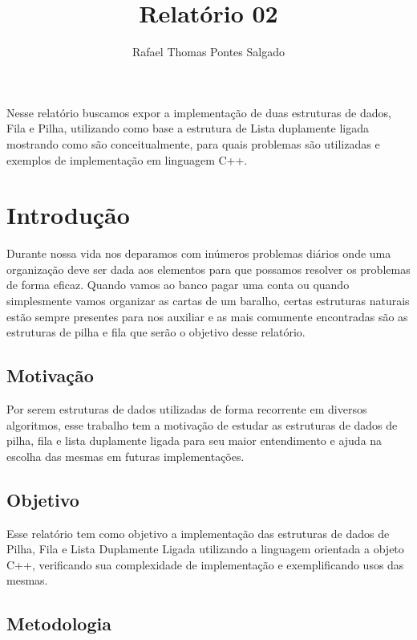 \documentclass[rascunho,xindy,sublist]{fei}
\author{Rafael Thomas Pontes Salgado}
\title{Relatório 02}
\begin{document}
\maketitle

\begin{resumo}
Nesse relatório buscamos expor a implementação de duas estruturas de dados, Fila e Pilha, utilizando como base a estrutura de Lista duplamente ligada mostrando como são conceitualmente, para quais problemas são utilizadas e exemplos de implementação em linguagem C++.
\end{resumo}

\tableofcontents

\chapter{Introdução}

Durante nossa vida nos deparamos com inúmeros problemas diários onde uma organização deve ser dada aos elementos para que possamos resolver os problemas de forma eficaz. Quando vamos ao banco pagar uma conta ou quando simplesmente vamos organizar as cartas de um baralho, certas estruturas naturais estão sempre presentes para nos auxiliar e as mais comumente encontradas são as estruturas de pilha e fila que serão o objetivo desse relatório.

\section{Motivação}

Por serem estruturas de dados utilizadas de forma recorrente em diversos algoritmos, esse trabalho tem a motivação de estudar as estruturas de dados de pilha, fila e lista duplamente ligada para seu maior entendimento e ajuda na escolha das mesmas em futuras implementações.

\section{Objetivo}

Esse relatório tem como objetivo a implementação das estruturas de dados de Pilha, Fila e Lista Duplamente Ligada utilizando a linguagem orientada a objeto C++, verificando sua complexidade de implementação e exemplificando usos das mesmas.

\section{Metodologia}
\end{document}
